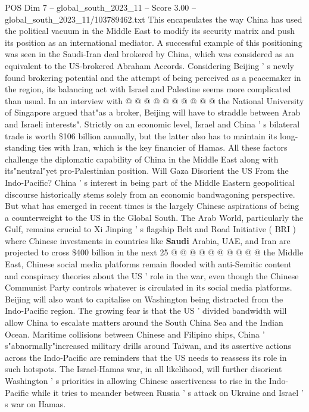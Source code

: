 \begin{textsample}{POS Dim 7 – global\_south\_2023\_11 – Score 3.00 – global\_south\_2023\_11/103789462.txt}
This encapsulates the way China has used the political vacuum in the Middle East to modify its security matrix and push its position as an international mediator.
A successful example of this positioning was seen in the Saudi-Iran deal brokered by China, which was considered as an equivalent to the US-brokered Abraham Accords.
Considering Beijing ' s newly found brokering potential and the attempt of being perceived as a peacemaker in the region, its balancing act with Israel and Palestine seems more complicated than usual.
In an interview with @ @ @ @ @ @ @ @ @ @ the National University of Singapore argued that"as a broker, Beijing will have to straddle between Arab and Israeli interests".
Strictly on an economic level, Israel and China ' s bilateral trade is worth \$106 billion annually, but the latter also has to maintain its long-standing ties with Iran, which is the key financier of Hamas.
All these factors challenge the diplomatic capability of China in the Middle East along with its"neutral"yet pro-Palestinian position.
Will Gaza Disorient the US From the Indo-Pacific?
China ' s interest in being part of the Middle Eastern geopolitical discourse historically stems solely from an economic bandwagoning perspective.
But what has emerged in recent times is the largely Chinese aspirations of being a counterweight to the US in the Global South.
The Arab World, particularly the Gulf, remains crucial to Xi Jinping ' s flagship Belt and Road Initiative ( BRI ) where Chinese investments in countries like \textbf{Saudi} Arabia, UAE, and Iran are projected to cross \$400 billion in the next 25 @ @ @ @ @ @ @ @ @ @ the Middle East, Chinese social media platforms remain flooded with anti-Semitic content and conspiracy theories about the US ' role in the war, even though the Chinese Communist Party controls whatever is circulated in its social media platforms.
Beijing will also want to capitalise on Washington being distracted from the Indo-Pacific region.
The growing fear is that the US ' divided bandwidth will allow China to escalate matters around the South China Sea and the Indian Ocean.
Maritime collisions between Chinese and Filipino ships, China ' s"abnormally"increased military drills around Taiwan, and its assertive actions across the Indo-Pacific are reminders that the US needs to reassess its role in such hotspots.
The Israel-Hamas war, in all likelihood, will further disorient Washington ' s priorities in allowing Chinese assertiveness to rise in the Indo-Pacific while it tries to meander between Russia ' s attack on Ukraine and Israel ' s war on Hamas.

\end{textsample}
